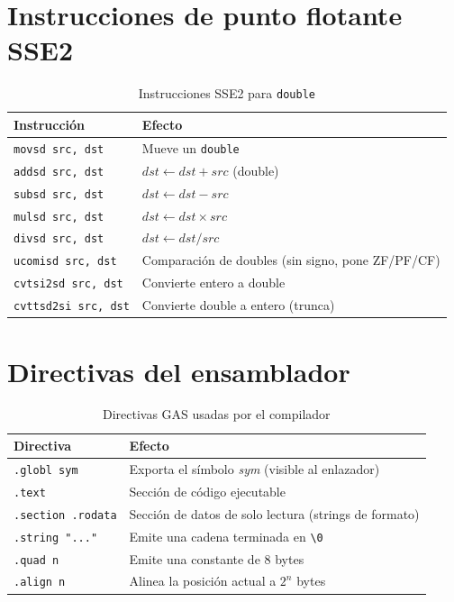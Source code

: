 \section{Instrucciones de punto flotante SSE2}

\begin{table}[H]
  \centering
  \caption{Instrucciones SSE2 para \texttt{double}}
  \label{tab:sse}
  \begin{tabular}{lp{8cm}}
    \toprule
    \textbf{Instrucción}          & \textbf{Efecto} \\
    \midrule
    \texttt{movsd src, dst}       & Mueve un \texttt{double} \\
    \texttt{addsd src, dst}       & $dst \leftarrow dst + src$ (double) \\
    \texttt{subsd src, dst}       & $dst \leftarrow dst - src$ \\
    \texttt{mulsd src, dst}       & $dst \leftarrow dst \times src$ \\
    \texttt{divsd src, dst}       & $dst \leftarrow dst / src$ \\
    \texttt{ucomisd src, dst}     & Comparación de doubles (sin signo, pone ZF/PF/CF) \\
    \texttt{cvtsi2sd src, dst}    & Convierte entero a double \\
    \texttt{cvttsd2si src, dst}   & Convierte double a entero (trunca) \\
    \bottomrule
  \end{tabular}
\end{table}

\section{Directivas del ensamblador}

\begin{table}[H]
  \centering
  \caption{Directivas GAS usadas por el compilador}
  \label{tab:directivas}
  \begin{tabular}{lp{8cm}}
    \toprule
    \textbf{Directiva}            & \textbf{Efecto} \\
    \midrule
    \texttt{.globl sym}           & Exporta el símbolo \textit{sym} (visible al enlazador) \\
    \texttt{.text}                & Sección de código ejecutable \\
    \texttt{.section .rodata}     & Sección de datos de solo lectura (strings de formato) \\
    \texttt{.string "..."}        & Emite una cadena terminada en \verb|\0| \\
    \texttt{.quad n}              & Emite una constante de 8 bytes \\
    \texttt{.align n}             & Alinea la posición actual a $2^n$ bytes \\
    \bottomrule
  \end{tabular}
\end{table}

